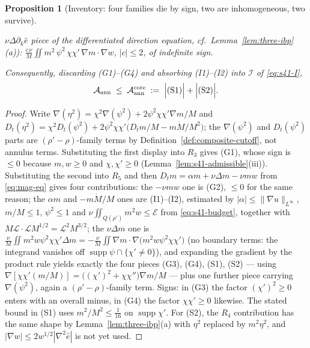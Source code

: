\documentclass[11pt]{article}
\newtheorem{proposition}[theorem]{Proposition}
\theoremstyle{definition}
\theoremstyle{remark}
\begin{document}
\begin{proposition}[Inventory: four families die by sign, two are
  inhomogeneous, two survive]
\begin{enumerate}[label=\textup{(S\arabic*)}]
      $\nu\Delta\partial_k\hat{e}$ piece of the differentiated direction
      equation, cf.\ Lemma~\ref{lem:three-ibp}(a)):
      $\displaystyle \frac{c\,\nu}{M}\iint m^2\,\psi^2\,\chi\chi'\,
      \nabla m\cdot\nabla w$, $|c|\leq2$, of indefinite sign.
  \end{enumerate}
  Consequently, discarding (G1)--(G4) and absorbing (I1)--(I2) into
  $\mathcal{I}$ of \eqref{eq:s41-I},
  \begin{equation}\label{eq:s41-core}
    \mathcal{A}_{\mathrm{ann}}
    \;\leq\;
    \mathcal{A}^{\mathrm{core}}_{\mathrm{ann}}
    \;:=\;
    \Bigl|\text{\upshape(S1)}\Bigr| + \Bigl|\text{\upshape(S2)}\Bigr| .
  \end{equation}
\end{proposition}
\begin{proof}
  Write $\nabla(\eta^2)=\chi^2\nabla(\psi^2)+2\psi^2\chi\chi'\nabla m/M$ and
  $D_t(\eta^2)=\chi^2D_t(\psi^2)
  +2\psi^2\chi\chi'\bigl(D_tm/M-m\dot M/M^2\bigr)$; the $\nabla(\psi^2)$ and
  $D_t(\psi^2)$ parts are $(\rho'-\rho)$-family terms by
  Definition~\ref{def:composite-cutoff}, not annulus terms. Substituting the
  first display into $R_3$ gives (G1), whose sign is
  $\leq0$ because $m,w\geq0$ and $\chi,\chi'\geq0$
  (Lemma~\ref{lem:s41-admissible}(iii)). Substituting the second into $R_5$
  and then $D_tm=\alpha m+\nu\Delta m-\nu mw$ from \eqref{eq:mag-eq} gives
  four contributions: the $-\nu mw$ one is (G2), $\leq0$ for the same
  reason; the $\alpha m$ and $-m\dot M/M$ ones are (I1)--(I2), estimated by
  $|\alpha|\leq\|\nabla u\|_{L^\infty}$, $m/M\leq1$, $\psi^2\leq1$ and
  $\nu\iint_{Q(\rho')}m^2w\leq\mathcal{E}$ from
  \eqref{eq:s41-budget}, together with $M\mathcal{L}\cdot\mathcal{L}M^{1/2}
  =\mathcal{L}^2M^{3/2}$; the $\nu\Delta m$ one is
  $\frac{\nu}{M}\iint m^2w\psi^2\chi\chi'\Delta m
  =-\frac{\nu}{M}\iint\nabla m\cdot\nabla\bigl(m^2w\psi^2\chi\chi'\bigr)$
  (no boundary terms: the integrand vanishes off
  $\operatorname{supp}\psi\cap\{\chi'\neq0\}$), and expanding the gradient by
  the product rule yields exactly the four pieces (G3), (G4), (S1), (S2)
  --- using $\nabla[\chi\chi'(m/M)]
  =\bigl((\chi')^2+\chi\chi''\bigr)\nabla m/M$ --- plus one further piece
  carrying $\nabla(\psi^2)$, again a $(\rho'-\rho)$-family term. Signs: in
  (G3) the factor $(\chi')^2\geq0$ enters with an overall minus, in (G4)
  the factor $\chi\chi'\geq0$ likewise. The stated bound in (S1) uses
  $m^2/M^2\leq\tfrac{1}{16}$ on $\operatorname{supp}\chi'$.
  For (S2), the $R_4$ contribution has the same shape by
  Lemma~\ref{lem:three-ibp}(a) with $\eta^2$ replaced by $m^2\eta^2$, and
  $|\nabla w|\leq2w^{1/2}|\nabla^2\hat{e}|$ is not yet used.
\end{proof}
\end{document}
